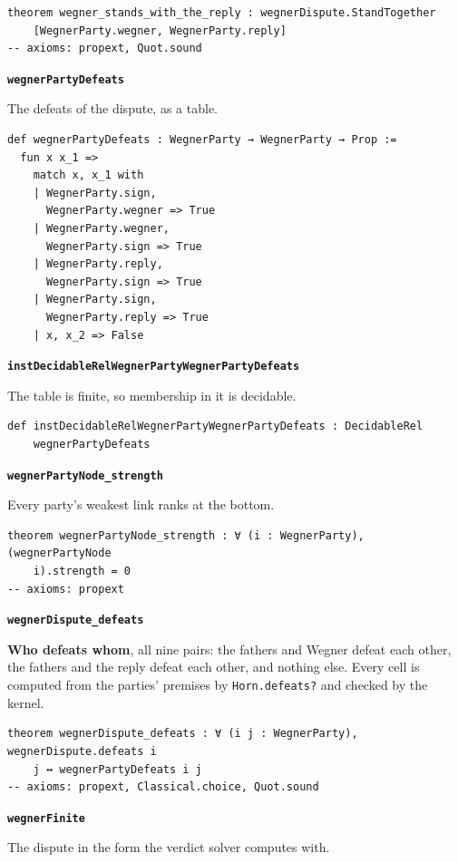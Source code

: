 \documentclass[11pt]{article}
\begin{document}
{\small\begin{verbatim}
theorem wegner_stands_with_the_reply : wegnerDispute.StandTogether
    [WegnerParty.wegner, WegnerParty.reply]
-- axioms: propext, Quot.sound
\end{verbatim}}
\par\medskip\noindent\textbf{\texttt{wegner\allowbreak{}Party\allowbreak{}Defeats}}\par\nobreak\noindent
The defeats of the dispute, as a table.

{\small\begin{verbatim}
def wegnerPartyDefeats : WegnerParty → WegnerParty → Prop :=
  fun x x_1 =>
    match x, x_1 with
    | WegnerParty.sign,
      WegnerParty.wegner => True
    | WegnerParty.wegner,
      WegnerParty.sign => True
    | WegnerParty.reply,
      WegnerParty.sign => True
    | WegnerParty.sign,
      WegnerParty.reply => True
    | x, x_2 => False
\end{verbatim}}
\par\medskip\noindent\textbf{\texttt{inst\allowbreak{}Decidable\allowbreak{}Rel\allowbreak{}Wegner\allowbreak{}Party\allowbreak{}Wegner\allowbreak{}Party\allowbreak{}Defeats}}\par\nobreak\noindent
The table is finite, so membership in it is decidable.

{\small\begin{verbatim}
def instDecidableRelWegnerPartyWegnerPartyDefeats : DecidableRel
    wegnerPartyDefeats
\end{verbatim}}
\par\medskip\noindent\textbf{\texttt{wegner\allowbreak{}Party\allowbreak{}Node\_\allowbreak{}strength}}\par\nobreak\noindent
Every party's weakest link ranks at the bottom.

{\small\begin{verbatim}
theorem wegnerPartyNode_strength : ∀ (i : WegnerParty), (wegnerPartyNode
    i).strength = 0
-- axioms: propext
\end{verbatim}}
\par\medskip\noindent\textbf{\texttt{wegner\allowbreak{}Dispute\_\allowbreak{}defeats}}\par\nobreak\noindent
\textbf{Who defeats whom}, all nine pairs: the fathers and Wegner defeat each other, the fathers and the reply defeat each other, and nothing else. Every cell is computed from the parties' premises by \texttt{Horn.defeats?} and checked by the kernel.

{\small\begin{verbatim}
theorem wegnerDispute_defeats : ∀ (i j : WegnerParty), wegnerDispute.defeats i
    j ↔ wegnerPartyDefeats i j
-- axioms: propext, Classical.choice, Quot.sound
\end{verbatim}}
\par\medskip\noindent\textbf{\texttt{wegner\allowbreak{}Finite}}\par\nobreak\noindent
The dispute in the form the verdict solver computes with.
\end{document}
